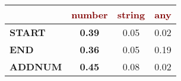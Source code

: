 \renewcommand{\arraystretch}{0.5}
\scriptsize
\begin{tabular}{@{}l c@{\hskip 1mm} c@{\hskip 1mm} c@{}}
\toprule
& \textbf{\textcolor{Maroon}{number}} & \textbf{\textcolor{Maroon}{string}} & \textbf{\textcolor{Maroon}{any}}\\ 
\midrule
\textbf{\textcolor{mygreen}{START}} & \textbf{0.39} & 0.05 & 0.02\\
\textbf{\textcolor{mygreen}{END}} & \textbf{0.36} & 0.05 & 0.19\\
\textbf{\textcolor{mygreen}{ADDNUM}} & \textbf{0.45} & 0.08 & 0.02\\
\bottomrule
\end{tabular}